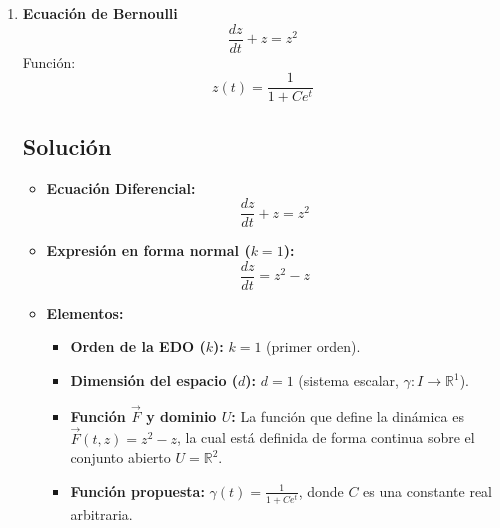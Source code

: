 \begin{enumerate}[label=\arabic*., leftmargin=*]
\begin{enumerate}[label=(\alph*), leftmargin=*]
        \item Qué condición impone a las curvas integrales los valores determinados en el inciso anterior.
        
        Evidentemente, cuando la variable dependiente toma estos valores (\textbf{$y = \sqrt{\frac{5}{3}}$} y \textbf{$y = -\sqrt{\frac{5}{3}}$}), el denominador se anula y la pendiente de la curva tiende a infinito. Esto significa que, al aproximarse a estas líneas horizontales, las curvas integrales desarrollan tangentes completamente verticales. Sin embargo, por definición matemática, la gráfica de una solución derivable no puede tener una línea tangente vertical en ninguna parte. Entonces, los valores que determinamos actúan como una barrera que fragmenta el plano; las soluciones quedan confinadas a regiones específicas y no pueden cruzar estas fronteras, limitando así el intervalo de definición en el que una solución particular es válida y continua.
    \end{enumerate}

    \item \textbf{Ecuación de Bernoulli}
    \[ \frac{dz}{dt}+z=z^{2} \]
    Función:
    \[ z(t)=\frac{1}{1+Ce^{t}} \]
    \subsection*{Solución}

    \begin{itemize}[leftmargin=*]
        \item \textbf{Ecuación Diferencial:}
        \[ \frac{dz}{dt} + z = z^2 \]
        
        \item \textbf{Expresión en forma normal ($k = 1$):}
        \[ \frac{dz}{dt} = z^2 - z \]
        
        \item \textbf{Elementos:}
        \begin{itemize}[leftmargin=*]
            \item \textbf{Orden de la EDO ($k$):} $k = 1$ (primer orden).
            \item \textbf{Dimensión del espacio ($d$):} $d = 1$ (sistema escalar, $\gamma: I \to \mathbb{R}^1$).
            \item \textbf{Función $\vec{F}$ y dominio $U$:} La función que define la dinámica es $\vec{F}(t, z) = z^2 - z$, la cual está definida de forma continua sobre el conjunto abierto $U = \mathbb{R}^2$.
            \item \textbf{Función propuesta:} $\gamma(t) = \frac{1}{1 + Ce^t}$, donde $C$ es una constante real arbitraria.
        \end{itemize}
    \end{itemize}


\end{enumerate}
